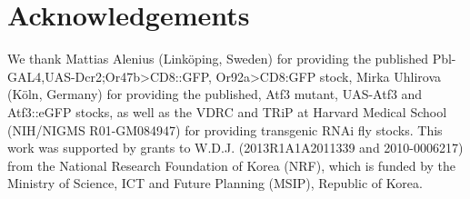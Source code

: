 \section*{Acknowledgements}

We thank Mattias Alenius (Link{\"{o}}ping, Sweden) for providing the published Pbl-GAL4,UAS-Dcr2;Or47b\textgreater{}CD8::GFP, Or92a\textgreater{}CD8:GFP stock, Mirka Uhlirova (K{\"{o}}ln, Germany) for providing the published, Atf3 mutant, UAS-Atf3 and Atf3::eGFP stocks, as well as the VDRC and TRiP at Harvard Medical School (NIH/NIGMS R01-GM084947) for providing transgenic RNAi fly stocks.
This work was supported by grants to W.D.J. (2013R1A1A2011339 and 2010-0006217) from the National Research Foundation of Korea (NRF), which is funded by the Ministry of Science, ICT and Future Planning (MSIP), Republic of Korea.